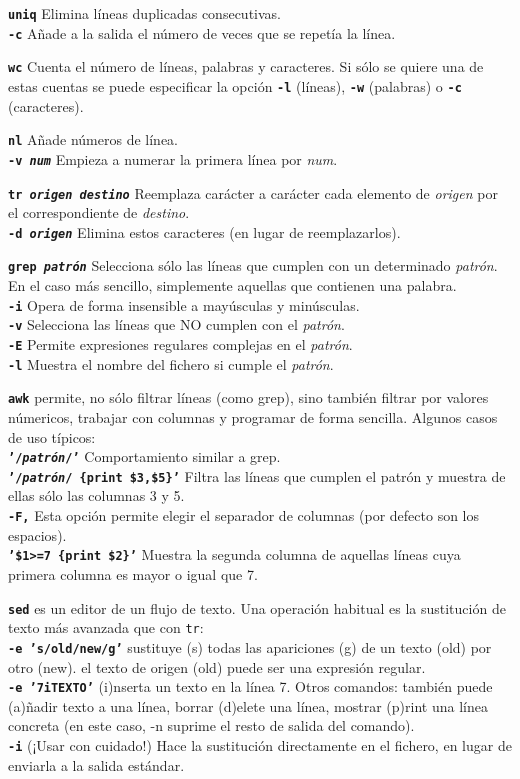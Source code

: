 \documentclass[10pt,landscape,a4paper]{article}
\newcommand{\code}{\texttt}
\newcommand{\bcode}[1]{\texttt{\textbf{#1}}}
\begin{document}
\begin{multicols}{3}
\bcode{uniq} Elimina líneas duplicadas consecutivas.\\
  \bcode{-c} Añade a la salida el número de veces que se repetía la línea.

\bcode{wc} Cuenta el número de líneas, palabras y caracteres. Si sólo se quiere una de estas cuentas se puede especificar la opción \bcode{-l} (líneas), \bcode{-w} (palabras) o \bcode{-c} (caracteres).

\bcode{nl} Añade números de línea.\\
  \bcode{-v \emph{num}} Empieza a numerar la primera línea por \emph{num}.

\bcode{tr \emph{origen} \emph{destino}} Reemplaza carácter a carácter cada elemento de \emph{origen} por el correspondiente de \emph{destino}.\\
  \bcode{-d \emph{origen}} Elimina estos caracteres (en lugar de reemplazarlos).

\bcode{grep \emph{patrón}} Selecciona sólo las líneas que cumplen con un determinado \emph{patrón}. En el caso más sencillo, simplemente aquellas que contienen una palabra.\\
  \bcode{-i} Opera de forma insensible a mayúsculas y minúsculas.\\
  \bcode{-v} Selecciona las líneas que NO cumplen con el \emph{patrón}.\\
  \bcode{-E} Permite expresiones regulares complejas en el \emph{patrón}.\\
  \bcode{-l} Muestra el nombre del fichero si cumple el \emph{patrón}.

\bcode{awk} permite, no sólo filtrar líneas (como grep), sino también filtrar por valores númericos, trabajar con columnas y programar de forma sencilla. Algunos casos de uso típicos:\\
  \bcode{'/\emph{patrón}/'} Comportamiento similar a grep.\\
  \bcode{'/\emph{patrón}/ \{print \$3,\$5\}'} Filtra las líneas que cumplen el patrón y muestra de ellas sólo las columnas 3 y 5.\\
  \bcode{-F,} Esta opción permite elegir el separador de columnas (por defecto son los espacios).\\
  \bcode{'\$1>=7 \{print \$2\}'} Muestra la segunda columna de aquellas líneas cuya primera columna es mayor o igual que 7.

\bcode{sed} es un editor de un flujo de texto. Una operación habitual es la sustitución de texto más avanzada que con \code{tr}:\\
  \bcode{-e 's/old/new/g'} sustituye (s) todas las apariciones (g) de un texto (old) por otro (new). el texto de origen (old) puede ser una expresión regular.\\
  \bcode{-e '7iTEXTO'} (i)nserta un texto en la línea 7. Otros comandos: también puede (a)ñadir texto a una línea, borrar (d)elete una línea, mostrar (p)rint una línea concreta (en este caso, -n suprime el resto de salida del comando).\\
  \bcode{-i} (¡Usar con cuidado!) Hace la sustitución directamente en el fichero, en lugar de enviarla a la salida estándar.


\end{multicols}
\end{document}
